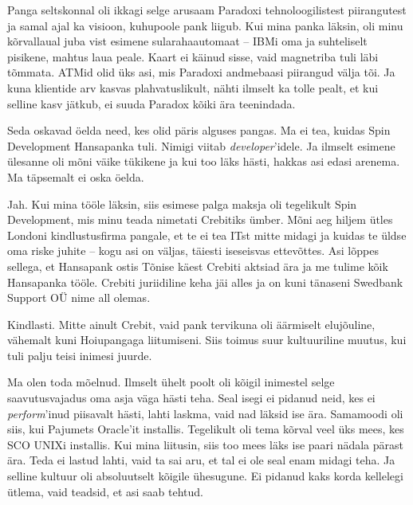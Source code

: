 
Panga seltskonnal oli ikkagi selge arusaam Paradoxi 
tehnoloogilistest piirangutest ja samal ajal ka visioon, kuhupoole 
pank liigub. Kui mina panka läksin, 
oli minu kõrvallaual juba vist esimene sularahaautomaat -- IBMi oma ja
suhteliselt pisikene, mahtus laua peale. Kaart ei käinud 
sisse, vaid magnetriba tuli läbi tõmmata. ATMid olid 
üks asi, mis Paradoxi andmebaasi piirangud välja tõi. Ja kuna 
klientide arv kasvas plahvatuslikult, nähti ilmselt ka tolle pealt, et kui selline kasv jätkub, ei suuda
Paradox kõiki ära teenindada.


Seda oskavad öelda need, kes olid päris alguses pangas. Ma ei 
tea, kuidas Spin Development Hansapanka tuli. 
Nimigi viitab \emph{developer}'idele. Ja 
ilmselt esimene ülesanne oli mõni väike tükikene ja 
kui too läks hästi, hakkas asi edasi arenema. Ma täpsemalt ei oska öelda.


Jah. Kui mina tööle läksin, siis esimese palga maksja oli tegelikult Spin 
Development, mis minu teada nimetati 
Crebitiks ümber. Mõni aeg hiljem ütles Londoni 
kindlustusfirma pangale, et te ei tea ITst mitte midagi ja kuidas te üldse oma riske juhite -- kogu 
asi on väljas, täiesti iseseisvas ettevõttes. Asi lõppes sellega, et Hansapank ostis Tõnise käest 
Crebiti aktsiad ära ja me tulime kõik Hansapanka tööle. Crebiti 
juriidiline keha jäi alles ja on kuni tänaseni Swedbank Support OÜ nime 
all olemas.


Kindlasti. Mitte ainult Crebit, vaid pank tervikuna oli 
äärmiselt elujõuline, vähemalt kuni 
Hoiupangaga liitumiseni. Siis toimus suur kultuuriline 
muutus, kui tuli palju teisi inimesi juurde.


Ma olen toda mõelnud. Ilmselt ühelt poolt oli kõigil inimestel selge saavutusvajadus oma asja väga hästi teha. Seal 
isegi ei pidanud neid, kes ei \emph{perform}'inud 
piisavalt hästi, lahti laskma, vaid nad läksid ise ära. Samamoodi oli siis, kui 
Pajumets Oracle'it installis. 
Tegelikult oli tema kõrval veel üks mees, kes SCO UNIXi installis. 
Kui mina liitusin, siis too mees läks ise paari nädala pärast 
ära. Teda ei lastud lahti, vaid ta sai aru, et tal ei ole seal enam midagi teha. Ja selline kultuur 
oli absoluutselt kõigile ühesugune. Ei pidanud kaks korda kellelegi ütlema, 
vaid teadsid, et asi saab tehtud.

